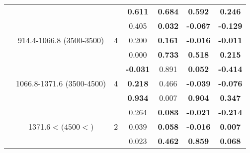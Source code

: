 \begin{table}[htbp]
\begin{tabular}{rrrcccc}
    \multicolumn{1}{c}{} & \multicolumn{1}{c}{} & \multicolumn{1}{c}{} & \textbf{0.611 } & \textbf{0.684 } & \textbf{0.592 } & \textbf{0.246 } \bigstrut\\\cline{4-7}\noalign{\smallskip}
    \multicolumn{1}{c}{\multirow{3}[2]{*}{4}} & \multicolumn{1}{c}{\multirow{3}[2]{2.5cm}{914.4-1066.8 (3500-3500)}} & \multicolumn{1}{c}{\multirow{3}[2]{*}{4}} & 0.405  & \textbf{0.032 } & \textbf{-0.067 } & \textbf{-0.129 } \\
    \multicolumn{1}{c}{} & \multicolumn{1}{c}{} & \multicolumn{1}{c}{} & 0.200  & \textbf{0.161 } & \textbf{-0.016 } & \textbf{-0.011 } \\
    \multicolumn{1}{c}{} & \multicolumn{1}{c}{} & \multicolumn{1}{c}{} & 0.000  & \textbf{0.733 } & \textbf{0.518 } & \textbf{0.215 } \bigstrut\\\cline{4-7}\noalign{\smallskip}
    \multicolumn{1}{c}{\multirow{3}[2]{*}{5}} & \multicolumn{1}{c}{\multirow{3}[2]{2.5cm}{1066.8-1371.6 (3500-4500)}} & \multicolumn{1}{c}{\multirow{3}[2]{*}{4}} & \textbf{-0.031 } & 0.891  & \textbf{0.052 } & \textbf{-0.414 } \\
    \multicolumn{1}{c}{} & \multicolumn{1}{c}{} & \multicolumn{1}{c}{} & \textbf{0.218 } & 0.466  & \textbf{-0.039 } & \textbf{-0.076 } \\
    \multicolumn{1}{c}{} & \multicolumn{1}{c}{} & \multicolumn{1}{c}{} & \textbf{0.934 } & 0.007  & \textbf{0.904 } & \textbf{0.347 } \bigstrut\\\cline{4-7}\noalign{\smallskip}
    \multicolumn{1}{c}{\multirow{3}[2]{*}{6}} & \multicolumn{1}{c}{\multirow{3}[2]{2.5cm}{1371.6$< (4500<$)}} & \multicolumn{1}{c}{\multirow{3}[2]{*}{2}} & 0.264  & \textbf{0.083 } & \textbf{-0.021 } & \textbf{-0.214 } \\
    \multicolumn{1}{c}{} & \multicolumn{1}{c}{} & \multicolumn{1}{c}{} & 0.039  & \textbf{0.058 } & \textbf{-0.016 } & \textbf{0.007 } \\
    \multicolumn{1}{c}{} & \multicolumn{1}{c}{} & \multicolumn{1}{c}{} & 0.023  & \textbf{0.462 } & \textbf{0.859 } & \textbf{0.068 } \\
    \bottomrule
    \end{tabular}%
  \label{tab:addlabel}%
\end{table}%
